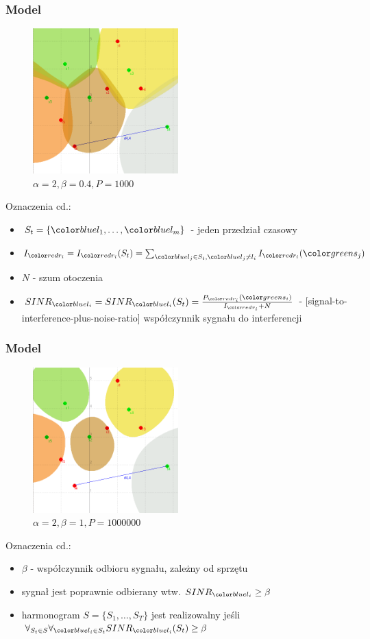 \documentclass[polish, t,10pt]{beamer}
\begin{document}
    \begin{frame}
        \frametitle{Model}
        \begin{figure}
            \includegraphics[width=0.5\textwidth]{pictures/model-diagram2.png}
            \caption{$\alpha=2, \beta=0.4, P=1000$}
        \end{figure}
        Oznaczenia cd.:
        \begin{itemize}
            \item $S_t = \{\lo, \ldots, \lm\}$ - jeden przedział czasowy
            \item $I_{\ri} = I_{\ri}(S_t) = \sum_{\lj \in S_t, \lj \neq l_i} I_{\ri}(\sj)$
            \item $N$ - szum otoczenia
            \item $SINR_{\li} = SINR_{\li}(S_t) = \frac{P_{\ri}(\si)}{I_{\ri} + N}$ - [signal-to-interference-plus-noise-ratio] współczynnik sygnału do interferencji
        \end{itemize}
    \end{frame}
    \begin{frame}
        \frametitle{Model}
        \begin{figure}
            \includegraphics[width=0.5\textwidth]{pictures/model-diagram3.png}
            \caption{$\alpha=2, \beta=1, P=1000000$}
        \end{figure}
        Oznaczenia cd.:
        \begin{itemize}
            \item $\beta$ - współczynnik odbioru sygnału, zależny od sprzętu
            \item sygnał jest poprawnie odbierany wtw. $SINR_{\li} \geq \beta$
            \item harmonogram $S = \{S_1, \ldots, S_T\}$ jest realizowalny jeśli $\forall_{S_t \in S} \forall_{\li \in S_t} SINR_{\li}(S_t) \geq \beta$
        \end{itemize}
    \end{frame}
\end{document}
